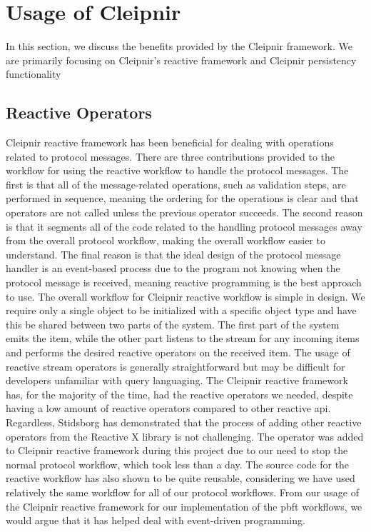 \section{Usage of Cleipnir}
In this section, we discuss the benefits provided by the Cleipnir framework. We are primarily focusing on Cleipnir's reactive framework and Cleipnir persistency functionality
\subsection{Reactive Operators}
Cleipnir reactive framework has been beneficial for dealing with operations related to protocol messages. There are three contributions provided to the workflow for using the reactive workflow to handle the protocol messages. The first is that all of the message-related operations, such as validation steps, are performed in sequence, meaning the ordering for the operations is clear and that operators are not called unless the previous operator succeeds. The second reason is that it segments all of the code related to the handling protocol messages away from the overall protocol workflow, making the overall workflow easier to understand. The final reason is that the ideal design of the protocol message handler is an event-based process due to the program not knowing when the protocol message is received, meaning reactive programming is the best approach to use. 
The overall workflow for Cleipnir reactive workflow is simple in design. We require only a single  object to be initialized with a specific object type and have this be shared between two parts of the system. The first part of the system emits the item, while the other part listens to the stream for any incoming items and performs the desired reactive operators on the received item. The usage of reactive stream operators is generally straightforward but may be difficult for developers unfamiliar with query languaging. The Cleipnir reactive framework has, for the majority of the time, had the reactive operators we needed, despite having a low amount of reactive operators compared to other reactive \ac{api}. Regardless, Stidsborg has demonstrated that the process of adding other reactive operators from the Reactive X library is not challenging. The  operator was added to Cleipnir reactive framework during this project due to our need to stop the normal protocol workflow, which took less than a day. The source code for the reactive workflow has also shown to be quite reusable, considering we have used relatively the same workflow for all of our protocol workflows. From our usage of the Cleipnir reactive framework for our implementation of the \ac{pbft} workflows, we would argue that it has helped deal with event-driven programming. 

